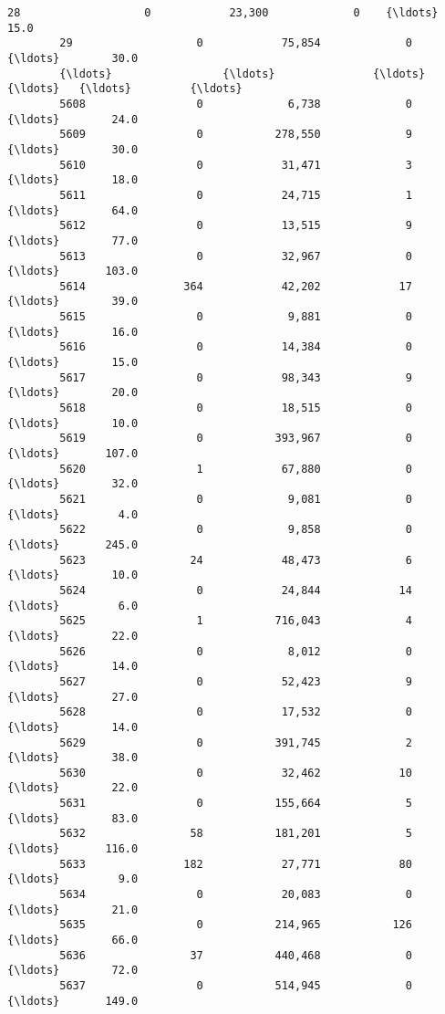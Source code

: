 \documentclass[11pt]{article}
\begin{document}
\begin{Verbatim}[commandchars=\\\{\}]
        28                   0            23,300             0    {\ldots}        15.0   
        29                   0            75,854             0    {\ldots}        30.0   
        {\ldots}                 {\ldots}               {\ldots}           {\ldots}   {\ldots}         {\ldots}   
        5608                 0             6,738             0    {\ldots}        24.0   
        5609                 0           278,550             9    {\ldots}        30.0   
        5610                 0            31,471             3    {\ldots}        18.0   
        5611                 0            24,715             1    {\ldots}        64.0   
        5612                 0            13,515             9    {\ldots}        77.0   
        5613                 0            32,967             0    {\ldots}       103.0   
        5614               364            42,202            17    {\ldots}        39.0   
        5615                 0             9,881             0    {\ldots}        16.0   
        5616                 0            14,384             0    {\ldots}        15.0   
        5617                 0            98,343             9    {\ldots}        20.0   
        5618                 0            18,515             0    {\ldots}        10.0   
        5619                 0           393,967             0    {\ldots}       107.0   
        5620                 1            67,880             0    {\ldots}        32.0   
        5621                 0             9,081             0    {\ldots}         4.0   
        5622                 0             9,858             0    {\ldots}       245.0   
        5623                24            48,473             6    {\ldots}        10.0   
        5624                 0            24,844            14    {\ldots}         6.0   
        5625                 1           716,043             4    {\ldots}        22.0   
        5626                 0             8,012             0    {\ldots}        14.0   
        5627                 0            52,423             9    {\ldots}        27.0   
        5628                 0            17,532             0    {\ldots}        14.0   
        5629                 0           391,745             2    {\ldots}        38.0   
        5630                 0            32,462            10    {\ldots}        22.0   
        5631                 0           155,664             5    {\ldots}        83.0   
        5632                58           181,201             5    {\ldots}       116.0   
        5633               182            27,771            80    {\ldots}         9.0   
        5634                 0            20,083             0    {\ldots}        21.0   
        5635                 0           214,965           126    {\ldots}        66.0   
        5636                37           440,468             0    {\ldots}        72.0   
        5637                 0           514,945             0    {\ldots}       149.0   
        

\end{Verbatim}
\end{document}
